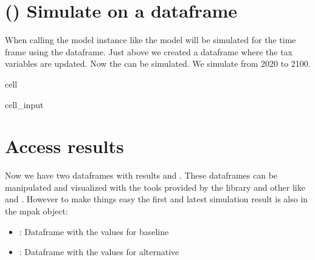 \documentclass[letterpaper,10pt,english]{jupyterBook}
\begin{document}
\section{() Simulate on a dataframe}
\label{\detokenize{content/Python/modelflow_features:simulate-on-a-dataframe}}
\sphinxAtStartPar
When calling the model instance like  the model will be simulated for the time frame  using the dataframe.  
Just above we created a dataframe  where the tax variables are updated. Now the  can be simulated. We simulate from 2020 to 2100.

\begin{sphinxuseclass}{cell}\begin{sphinxVerbatimInput}

\begin{sphinxuseclass}{cell_input}
\begin{sphinxVerbatim}[commandchars=\\\{\}]
   
\end{sphinxVerbatim}

\end{sphinxuseclass}\end{sphinxVerbatimInput}

\end{sphinxuseclass}

\section{Access results}
\label{\detokenize{content/Python/modelflow_features:access-results}}
\sphinxAtStartPar
Now we have two dataframes with results  and . These dataframes can be manipulated and visualized
with the tools provided by the  library and other like  and . However to make things easy the first and
latest simulation result is also in the mpak object:
\begin{itemize}
\item {} 
\sphinxAtStartPar
{}: Dataframe with the values for baseline

\item {} 
\sphinxAtStartPar
{}: Dataframe with the values for alternative

\end{itemize}
\end{document}
